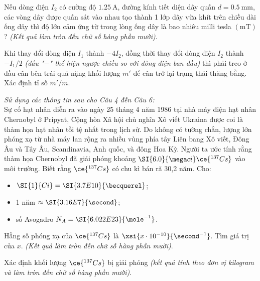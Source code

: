 \begin{ex}
	Nếu dòng điện $I_2$ có cường độ $\SI{1.25}{\ampere}$, đường kính tiết diện dây quấn $d=\SI{0.5}{\milli\meter}$, các vòng dây được quấn sát vào nhau tạo thành 1 lớp dây vừa khít trên chiều dài ống dây thì độ lớn cảm ứng từ trong lòng ống dây là bao nhiêu milli tesla $\left(\si{\milli\tesla}\right)$? \textit{(Kết quả làm tròn đến chữ số hàng phần mười)}.
	\loigiai{
		
	}
\end{ex}
\begin{ex}
	Khi thay đổi dòng điện $I_1$ thành $-4I_2$, đồng thời thay đổi dòng điện $I_2$ thành $-I_1/2$ \textit{(dấu "$-$" thể hiện ngược chiều so với dòng điện ban đầu)} thì phải treo ở đầu cân bên trái quả nặng khối lượng $m'$ để cân trở lại trạng thái thăng bằng. Xác định tỉ số $m'/m$.
	\loigiai{
		
	}
\end{ex}
\textit{Sử dụng các thông tin sau cho Câu 4 đến Câu 6:}\\
Sự cố hạt nhân diễn ra vào ngày 25 tháng 4 năm 1986 tại nhà máy điện hạt nhân Chernobyl ở Pripyat, Cộng hòa Xã hội chủ nghĩa Xô viết Ukraina được coi là thảm họa hạt nhân tồi tệ nhất trong lịch sử. Do không có tường chắn, lượng lớn phóng xạ từ nhà máy lan rộng ra nhiều vùng phía tây Liên bang Xô viết, Đông Âu và Tây Âu, Scandinavia, Anh quốc, và đông Hoa Kỳ. Người ta ước tính rằng thảm họa Chernobyl đã giải phóng khoảng $\SI{6.0}{\mega ci} \ce{^{137}Cs}$ vào môi trường. Biết rằng $\ce{^{137}Cs}$ có chu kì bán rã 30,2 năm. Cho:	
\begin{itemize}
	\item $\SI{1}{Ci}=\SI{3.7E10}{\becquerel}$;
	\item 1 năm $\approx\SI{3.16E7}{\second}$;
	\item số Avogadro $N_A=\SI{6.022E23}{\mole^{-1}}$.
\end{itemize}
\begin{ex}
Hằng số phóng xạ của $\ce{^{137}Cs}$ là $\xsi{x\cdot10^{-10}}{\second^{-1}}$. Tìm giá trị của $x$. \textit{(Kết quả làm tròn đến chữ số hàng phần mười)}.
	\loigiai{
		
	}
\end{ex}
\begin{ex}
	Xác định khối lượng $\ce{^{137}Cs}$ bị giải phóng \textit{(kết quả tính theo đơn vị kilogram và làm tròn đến chữ số hàng phần mười)}.
	\loigiai{
		
	}
\end{ex}

